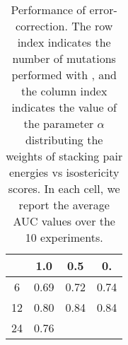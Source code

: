 \begin{table}
\begin{center}
\begin{tabular}{|c|c|c|c|}
\hline
& 1.0 & 0.5 & 0. \\
\hline
6 & 0.69 & 0.72 & 0.74 \\
12 & 0.80 & 0.84 & 0.84 \\
24 & 0.76 & & \\
\hline
\end{tabular}
\end{center}
\caption{Performance of error-correction. The row index indicates the number of mutations performed with \RNApyro, and the column index indicates
the value of the parameter $\alpha$ distributing the weights of stacking pair energies vs isostericity scores. In each cell, we report the average AUC
values over the 10 experiments.}
\label{tab:benchmark}
\end{table}

